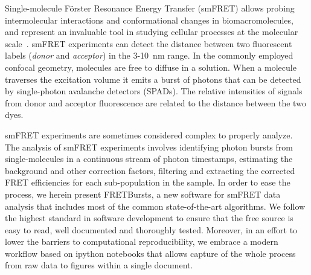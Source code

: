 Single-molecule Förster Resonance Energy Transfer (smFRET) allows probing intermolecular interactions
and conformational changes in biomacromolecules, and represent an 
invaluable tool in studying cellular processes at the molecular 
scale~\cite{Kapanidis_2006}. smFRET experiments can detect the distance between 
two fluorescent labels (\textit{donor} and \textit{acceptor}) in the 
3-10~nm range. In the commonly employed confocal geometry, molecules are free 
to diffuse in a solution. When a molecule traverses the excitation volume it 
emits a burst of photons that can be detected by single-photon avalanche detectors (SPADs). 
The relative intensities of signals from donor and acceptor fluorescence 
are related to the distance between the two dyes.

smFRET experiments are sometimes considered complex to properly analyze. 
The analysis of smFRET experiments involves identifying photon bursts from 
single-molecules in a continuous stream of photon timestamps, estimating the 
background and other correction factors, filtering and extracting the corrected 
FRET efficiencies for each sub-population in the sample. In order to ease 
the process, we herein present FRETBursts, a new software for smFRET data 
analysis that includes most of the common state-of-the-art algorithms. 
We follow the highest standard in software development to ensure that 
the free source is easy to read, well documented and thoroughly tested. 
Moreover, in an effort to lower the barriers to computational reproducibility, 
we embrace a modern workflow based on ipython notebooks that allows capture 
of the whole process from raw data to figures within a single document.
